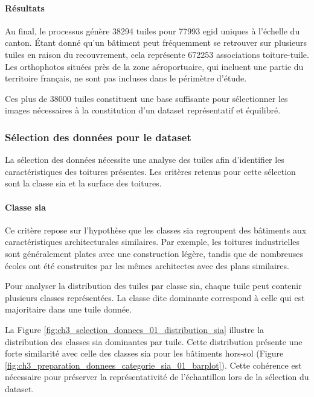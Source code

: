 \paragraph{Résultats}
Au final, le processus génère 38294 tuiles pour 77993 \gls{egid} uniques à l'échelle du canton. Étant donné qu'un bâtiment peut fréquemment se retrouver sur plusieurs tuiles en raison du recouvrement, cela représente 672253 associations toiture-tuile. Les orthophotos situées près de la zone aéroportuaire, qui incluent une partie du territoire français, ne sont pas incluses dans le périmètre d'étude.

Ces plus de 38000 tuiles constituent une base suffisante pour sélectionner les images nécessaires à la constitution d'un dataset représentatif et équilibré.

\newpage

\subsubsection{Sélection des données pour le dataset}
La sélection des données nécessite une analyse des tuiles afin d'identifier les caractéristiques des toitures présentes. Les critères retenus pour cette sélection sont la classe \gls{sia} et la surface des toitures.

\paragraph{Classe \gls{sia}}
Ce critère repose sur l'hypothèse que les classes \gls{sia} regroupent des bâtiments aux caractéristiques architecturales similaires. Par exemple, les toitures industrielles sont généralement plates avec une construction légère, tandis que de nombreuses écoles ont été construites par les mêmes architectes avec des plans similaires.

Pour analyser la distribution des tuiles par classe \gls{sia}, chaque tuile peut contenir plusieurs classes représentées. La classe dite dominante correspond à celle qui est majoritaire dans une tuile donnée.

La Figure \ref{fig:ch3_selection_donnees_01_distribution_sia} illustre la distribution des classes \gls{sia} dominantes par tuile. Cette distribution présente une forte similarité avec celle des classes \gls{sia} pour les bâtiments hors-sol (Figure \ref{fig:ch3_preparation_donnees_categorie_sia_01_barplot}). Cette cohérence est nécessaire pour préserver la représentativité de l'échantillon lors de la sélection du dataset.

